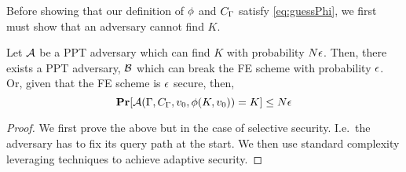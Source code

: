 Before showing that our definition of $\phi$ and $C_\Gamma$ satisfy \cref{eq:guessPhi}, we first must show that an adversary cannot find $K$.
\begin{lemma}
	\label{lem:findK}
	Let $\mathcal{A}$ be a PPT adversary which can find $K$ with probability $N\epsilon$.
	Then, there exists a PPT adversary, $\mathcal{B}$ which can break the FE scheme with probability $\epsilon$.	
	Or, given that the FE scheme is $\epsilon$ secure, then,
	\begin{equation*}
		\operatorname*{\mathbf{Pr}}[\mathcal{A}(\Gamma, C_\Gamma, v_0, \phi(K, v_0)) = K] \leq N\epsilon
	\end{equation*}
	\begin{proof}
		We first prove the above but in the case of selective security. I.e.\ the adversary has to fix
		its query path at the start.
		We then use standard complexity leveraging techniques to achieve adaptive security.


\end{proof}
\end{lemma}
